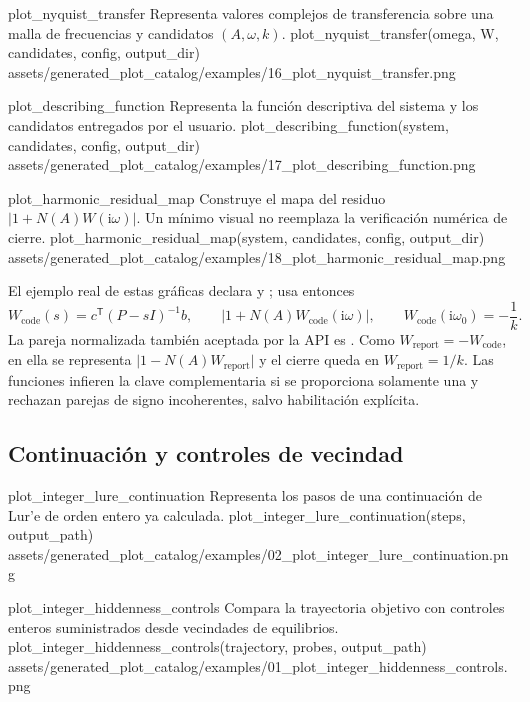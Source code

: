 \plotcatalogentry
  {plot_nyquist_transfer}
  {Representa valores complejos de transferencia sobre una malla de
  frecuencias y candidatos \((A,\omega,k)\).}
  {plot_nyquist_transfer(omega, W, candidates, config, output_dir)}
  {assets/generated_plot_catalog/examples/16_plot_nyquist_transfer.png}

\plotcatalogentry
  {plot_describing_function}
  {Representa la función descriptiva del sistema y los candidatos entregados
  por el usuario.}
  {plot_describing_function(system, candidates, config, output_dir)}
  {assets/generated_plot_catalog/examples/17_plot_describing_function.png}

\plotcatalogentry
  {plot_harmonic_residual_map}
  {Construye el mapa del residuo
  \(\lvert1+N(A)W(\mathrm{i}\omega)\rvert\). Un mínimo visual no reemplaza la
  verificación numérica de cierre.}
  {plot_harmonic_residual_map(system, candidates, config, output_dir)}
  {assets/generated_plot_catalog/examples/18_plot_harmonic_residual_map.png}

El ejemplo real de estas gráficas declara
 y
; usa entonces
\[
W_{\mathrm{code}}(s)=c^\mathsf{T}(P-sI)^{-1}b,\qquad
\left|1+N(A)W_{\mathrm{code}}(\mathrm{i}\omega)\right|,
\qquad W_{\mathrm{code}}(\mathrm{i}\omega_0)=-\frac{1}{k}.
\]
La pareja normalizada también aceptada por la API es
. Como
\(W_{\mathrm{report}}=-W_{\mathrm{code}}\), en ella se representa
\(\lvert1-N(A)W_{\mathrm{report}}\rvert\) y el cierre queda en
\(W_{\mathrm{report}}=1/k\). Las funciones infieren la clave complementaria
si se proporciona solamente una y rechazan parejas de signo incoherentes,
salvo habilitación explícita.

\subsection{Continuación y controles de vecindad}

\plotcatalogentry
  {plot_integer_lure_continuation}
  {Representa los pasos de una continuación de Lur'e de orden entero ya
  calculada.}
  {plot_integer_lure_continuation(steps, output_path)}
  {assets/generated_plot_catalog/examples/02_plot_integer_lure_continuation.png}

\plotcatalogentry
  {plot_integer_hiddenness_controls}
  {Compara la trayectoria objetivo con controles enteros suministrados desde
  vecindades de equilibrios.}
  {plot_integer_hiddenness_controls(trajectory, probes, output_path)}
  {assets/generated_plot_catalog/examples/01_plot_integer_hiddenness_controls.png}

